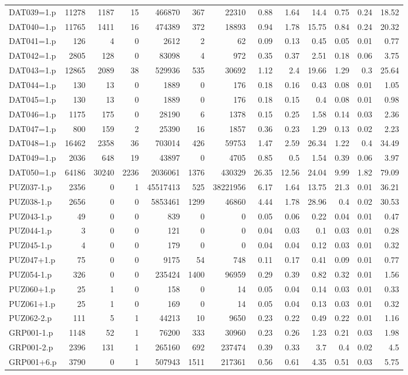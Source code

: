 \begin{table}[H]
\begin{adjustwidth}{-0.4in}{-0.5in}
\begin{tabular}{| l || r | r | r || r | r | r || r | r | r | r | r | r |}
DAT039=1.p&11278&1187&15&466870&367&22310&0.88&1.64&14.4&0.75&0.24&18.52\\
DAT040=1.p&11765&1411&16&474389&372&18893&0.94&1.78&15.75&0.84&0.24&20.32\\
DAT041=1.p&126&4&0&2612&2&62&0.09&0.13&0.45&0.05&0.01&0.77\\
DAT042=1.p&2805&128&0&83098&4&972&0.35&0.37&2.51&0.18&0.06&3.75\\
DAT043=1.p&12865&2089&38&529936&535&30692&1.12&2.4&19.66&1.29&0.3&25.64\\
DAT044=1.p&130&13&0&1889&0&176&0.18&0.16&0.43&0.08&0.01&1.05\\
DAT045=1.p&130&13&0&1889&0&176&0.18&0.15&0.4&0.08&0.01&0.98\\
DAT046=1.p&1175&175&0&28190&6&1378&0.15&0.25&1.58&0.14&0.03&2.36\\
DAT047=1.p&800&159&2&25390&16&1857&0.36&0.23&1.29&0.13&0.02&2.23\\
DAT048=1.p&16462&2358&36&703014&426&59753&1.47&2.59&26.34&1.22&0.4&34.49\\
DAT049=1.p&2036&648&19&43897&0&4705&0.85&0.5&1.54&0.39&0.06&3.97\\
DAT050=1.p&64186&30240&2236&2036061&1376&430329&26.35&12.56&24.04&9.99&1.82&79.09\\
PUZ037-1.p&2356&0&1&45517413&525&38221956&6.17&1.64&13.75&21.3&0.01&36.21\\
PUZ038-1.p&2656&0&0&5853461&1299&46860&4.44&1.78&28.96&0.4&0.02&30.53\\
PUZ043-1.p&49&0&0&839&0&0&0.05&0.06&0.22&0.04&0.01&0.47\\
PUZ044-1.p&3&0&0&121&0&0&0.04&0.03&0.1&0.03&0.01&0.28\\
PUZ045-1.p&4&0&0&179&0&0&0.04&0.04&0.12&0.03&0.01&0.32\\
PUZ047+1.p&75&0&0&9175&54&748&0.11&0.17&0.41&0.09&0.01&0.77\\
PUZ054-1.p&326&0&0&235424&1400&96959&0.29&0.39&0.82&0.32&0.01&1.56\\
PUZ060+1.p&25&1&0&158&0&14&0.05&0.04&0.14&0.03&0.01&0.33\\
PUZ061+1.p&25&1&0&169&0&14&0.05&0.04&0.13&0.03&0.01&0.32\\
PUZ062-2.p&111&5&1&44213&10&9650&0.23&0.22&0.49&0.22&0.01&1.16\\
GRP001-1.p&1148&52&1&76200&333&30960&0.23&0.26&1.23&0.21&0.03&1.98\\
GRP001-2.p&2396&131&1&265160&692&237474&0.39&0.33&3.7&0.4&0.02&4.5\\
GRP001+6.p&3790&0&1&507943&1511&217361&0.56&0.61&4.35&0.51&0.03&5.75\\

\end{tabular}
\end{adjustwidth}
\end{table}

